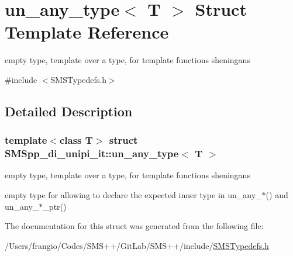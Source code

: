 \hypertarget{struct_s_m_spp__di__unipi__it_1_1un__any__type}{}\section{un\+\_\+any\+\_\+type$<$ T $>$ Struct Template Reference}
\label{struct_s_m_spp__di__unipi__it_1_1un__any__type}


empty type, template over a type, for template functions sheningans  




{\ttfamily \#include $<$S\+M\+S\+Typedefs.\+h$>$}



\subsection{Detailed Description}
\subsubsection*{template$<$class T$>$\newline
struct S\+M\+Spp\+\_\+di\+\_\+unipi\+\_\+it\+::un\+\_\+any\+\_\+type$<$ T $>$}

empty type, template over a type, for template functions sheningans 

empty type for allowing to declare the expected inner type in un\+\_\+any\+\_\+$\ast$() and un\+\_\+any\+\_\+$\ast$\+\_\+ptr() 

The documentation for this struct was generated from the following file\+:\begin{DoxyCompactItemize}
\item 
/\+Users/frangio/\+Codes/\+S\+M\+S++/\+Git\+Lab/\+S\+M\+S++/include/\mbox{\hyperlink{_s_m_s_typedefs_8h}{S\+M\+S\+Typedefs.\+h}}\end{DoxyCompactItemize}
